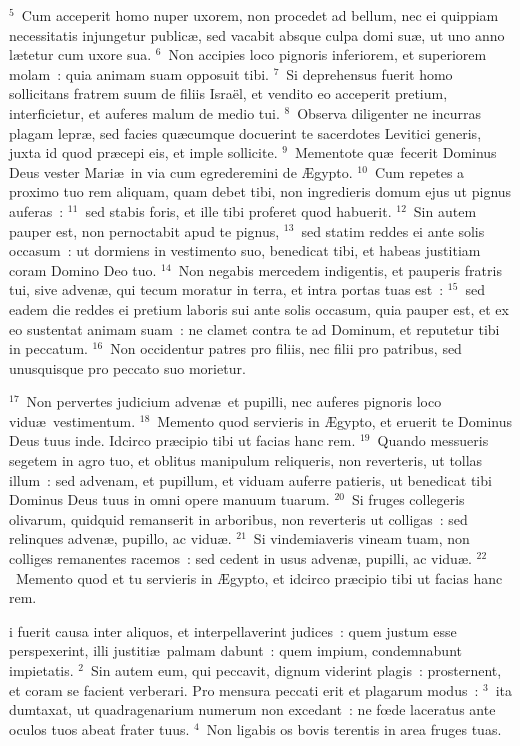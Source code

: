 ${}^{5}$~Cum acceperit homo nuper uxorem, non procedet ad bellum, nec ei quippiam necessitatis injungetur public\ae , sed vacabit absque culpa domi su\ae , ut uno anno l\ae tetur cum uxore sua.
${}^{6}$~Non accipies loco pignoris inferiorem, et superiorem molam~: quia animam suam opposuit tibi.
${}^{7}$~Si deprehensus fuerit homo sollicitans fratrem suum de filiis Isra\"el, et vendito eo acceperit pretium, interficietur, et auferes malum de medio tui.
${}^{8}$~Observa diligenter ne incurras plagam lepr\ae , sed facies qu\ae cumque docuerint te sacerdotes Levitici generis, juxta id quod pr\ae cepi eis, et imple sollicite.
${}^{9}$~Mementote qu\ae\ fecerit Dominus Deus vester Mari\ae\ in via cum egrederemini de \AE gypto.
${}^{10}$~Cum repetes a proximo tuo rem aliquam, quam debet tibi, non ingredieris domum ejus ut pignus auferas~:
${}^{11}$~sed stabis foris, et ille tibi proferet quod habuerit.
${}^{12}$~Sin autem pauper est, non pernoctabit apud te pignus,
${}^{13}$~sed statim reddes ei ante solis occasum~: ut dormiens in vestimento suo, benedicat tibi, et habeas justitiam coram Domino Deo tuo.
${}^{14}$~Non negabis mercedem indigentis, et pauperis fratris tui, sive adven\ae , qui tecum moratur in terra, et intra portas tuas est~:
${}^{15}$~sed eadem die reddes ei pretium laboris sui ante solis occasum, quia pauper est, et ex eo sustentat animam suam~: ne clamet contra te ad Dominum, et reputetur tibi in peccatum.
${}^{16}$~Non occidentur patres pro filiis, nec filii pro patribus, sed unusquisque pro peccato suo morietur.


${}^{17}$~Non pervertes judicium adven\ae\ et pupilli, nec auferes pignoris loco vidu\ae\ vestimentum.
${}^{18}$~Memento quod servieris in \AE gypto, et eruerit te Dominus Deus tuus inde. Idcirco pr\ae cipio tibi ut facias hanc rem.
${}^{19}$~Quando messueris segetem in agro tuo, et oblitus manipulum reliqueris, non reverteris, ut tollas illum~: sed advenam, et pupillum, et viduam auferre patieris, ut benedicat tibi Dominus Deus tuus in omni opere manuum tuarum.
${}^{20}$~Si fruges collegeris olivarum, quidquid remanserit in arboribus, non reverteris ut colligas~: sed relinques adven\ae , pupillo, ac vidu\ae .
${}^{21}$~Si vindemiaveris vineam tuam, non colliges remanentes racemos~: sed cedent in usus adven\ae , pupilli, ac vidu\ae .
${}^{22}$~Memento quod et tu servieris in \AE gypto, et idcirco pr\ae cipio tibi ut facias hanc rem.

\bchapter
{}i fuerit causa inter aliquos, et interpellaverint judices~: quem justum esse perspexerint, illi justiti\ae\ palmam dabunt~: quem impium, condemnabunt impietatis.
${}^{2}$~Sin autem eum, qui peccavit, dignum viderint plagis~: prosternent, et coram se facient verberari. Pro mensura peccati erit et plagarum modus~:
${}^{3}$~ita dumtaxat, ut quadragenarium numerum non excedant~: ne fœde laceratus ante oculos tuos abeat frater tuus.
${}^{4}$~Non ligabis os bovis terentis in area fruges tuas.


